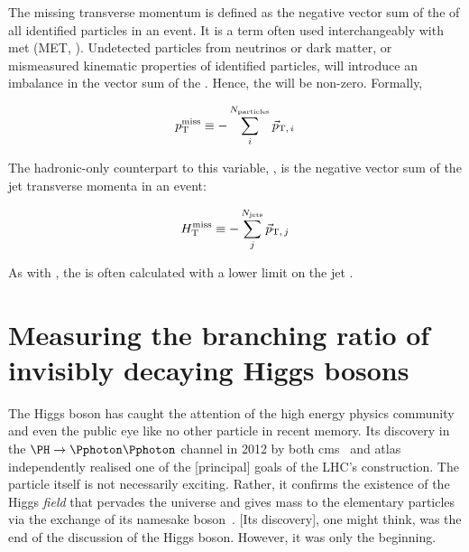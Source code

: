 The missing transverse momentum \ptmiss is defined as the negative vector sum of the \pt of all identified particles in an event. It is a term often used interchangeably with \gls{met} (MET, ). Undetected particles from neutrinos or dark matter, or mismeasured kinematic properties of identified particles, will introduce an imbalance in the vector sum of the \pt. Hence, the \ptmiss will be non-zero. Formally,

\begin{equation}
    p_{\mathrm{T}}^\text{miss} \equiv - \sum_i^{N_{\mathrm{particles}}} {\vec p}_{\mathrm{T}, \, i}
    \label{eq:met_definition}
\end{equation}

The hadronic-only counterpart to this variable, \mht, is the negative vector sum of the jet transverse momenta in an event:

\begin{equation}
    H_{\mathrm{T}}^{\text{miss}} \equiv - \sum_j^{N_{\mathrm{jets}}} {\vec p}_{\mathrm{T}, \, j}
    \label{eq:mht_definition}
\end{equation}

As with \HT, the \mht is often calculated with a lower limit on the jet \pt.





\section{Measuring the branching ratio of invisibly decaying Higgs bosons}
\label{sec:theory_higgs_to_inv}

The Higgs boson has caught the attention of the high energy physics community and even the public eye like no other particle in recent memory. Its discovery in the $\PH \rightarrow \Pphoton\Pphoton$ channel in 2012 by both \acrshort{cms}~\cite{Chatrchyan:2012xdj} and \acrshort{atlas}~\cite{Aad:2012tfa} independently realised one of the [principal] goals of the LHC's construction. The particle itself is not necessarily exciting. Rather, it confirms the existence of the Higgs \emph{field} that pervades the universe and gives mass to the elementary particles via the exchange of its namesake boson~\cite{PhysRevLett.13.321,PhysRevLett.13.508,PhysRevLett.13.585}. [Its discovery], one might think, was the end of the discussion of the Higgs boson. However, it was only the beginning.

